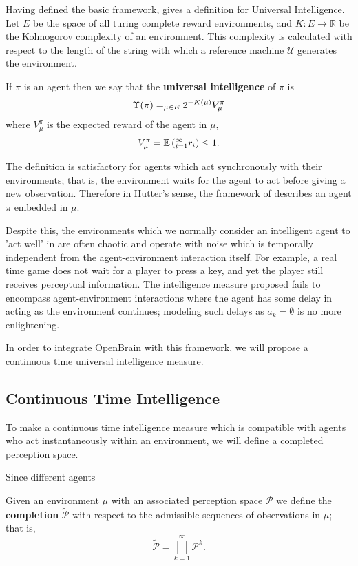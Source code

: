 Having defined the basic framework, \cite{legg2007universal} gives a definition for Universal Intelligence. Let $E$ be the space of all turing complete reward environments, and $K: E \to  \mathbb{R}$ be the Kolmogorov complexity of an environment. This complexity is calculated with respect to the length of the string with which a reference machine $\mathcal{U}$ generates the environment.
\begin{definition} \label{uim}
	If $\pi$ is an agent then we say that the \textbf{universal intelligence} of $\pi$ is
	\begin{equation} \label{eq:uim}
		\Upsilon(\pi) = \relax_{\mu \in E}2^{-K(\mu)}V_\mu^\pi
	\end{equation}
	where $V_\mu^\pi$ is the expected reward of the agent in $\mu$,
	\begin{equation} \label{eq:exprewarduim}
		V_\mu^\pi = \mathbb{E}\left(\relax_{i=1}^\infty r_i\right) \leq 1.
	\end{equation}
\end{definition}

The definition is satisfactory for agents which act synchronously with their environments; that is, the environment waits for the agent to act before giving a new observation. Therefore in Hutter's sense, the framework of \cite{legg2007universal} describes an agent $\pi$ embedded in $\mu$.

Despite this, the environments which we normally consider an intelligent agent to 'act well' in are often chaotic and operate with noise which is temporally independent from the agent-environment interaction itself.  For example, a real time game does not wait for a player to press a key, and yet the player still receives perceptual information. The intelligence measure proposed fails to encompass agent-environment interactions where the agent has some delay in acting as the environment continues; modeling such delays as $a_k = \emptyset$ is no more enlightening.

In order to integrate OpenBrain with this framework, we will propose a continuous time universal intelligence measure.

\subsection{Continuous Time Intelligence}

To make a continuous time intelligence measure which is compatible with agents who act instantaneously within an environment, we will define a completed perception space.

Since different agents 

\begin{definition}
	Given an environment $\mu$ with an associated 
	perception space $\mathcal{P}$ we define the
	\textbf{completion} $\tilde{\mathcal{P}}$ with respect to the admissible sequences of observations in $\mu$; that is,
	\begin{equation}
		\tilde{\mathcal{P}} = \bigsqcup_{k=1}^\infty \mathcal{P}^k.
	\end{equation}
\end{definition}
